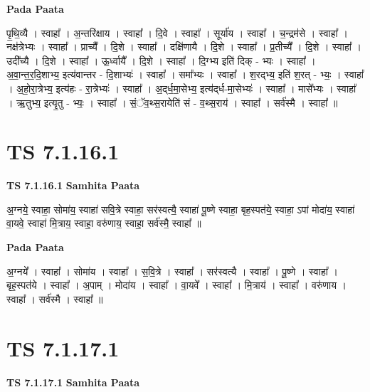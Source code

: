 \documentclass[17pt]{extarticle}
\begin{document}
\textbf{Pada Paata} \newline

पृ॒थि॒व्यै । स्वाहा᳚ । अ॒न्तरि॑क्षाय । स्वाहा᳚ । दि॒वे । स्वाहा᳚ । सूर्या॑य । स्वाहा᳚ । च॒न्द्रम॑से । स्वाहा᳚ । नक्ष॑त्रेभ्यः । स्वाहा᳚ । प्राच्यै᳚ । दि॒शे । स्वाहा᳚ । दक्षि॑णायै । दि॒शे । स्वाहा᳚ । प्र॒तीच्यै᳚ । दि॒शे । स्वाहा᳚ । उदी᳚च्यै । दि॒शे । स्वाहा᳚ । ऊ॒र्ध्वायै᳚ । दि॒शे । स्वाहा᳚ । दि॒ग्भ्य इति॑ दिक् - भ्यः । स्वाहा᳚ । अ॒वा॒न्त॒र॒दि॒शाभ्य॒ इत्य॑वान्तर - दि॒शाभ्यः॑ । स्वाहा᳚ । समा᳚भ्यः । स्वाहा᳚ । श॒रद्भ्य॒ इति॑ श॒रत् - भ्यः॒ । स्वाहा᳚ । अ॒हो॒रा॒त्रेभ्य॒ इत्य॑हः - रा॒त्रेभ्यः॑ । स्वाहा᳚ । अ॒द्‌र्ध॒मा॒सेभ्य॒ इत्य॑द्‌र्ध-मा॒सेभ्यः॑ । स्वाहा᳚ । मासे᳚भ्यः । स्वाहा᳚ । ऋ॒तुभ्य॒ इत्यृ॒तु - भ्यः॒ । स्वाहा᳚ । सं॒ॅव॒थ्स॒रायेति॑ सं - व॒थ्स॒राय॑ । स्वाहा᳚ । सर्व॑स्मै । स्वाहा᳚ ॥  \newline




\section*{ TS 7.1.16.1 }

\textbf{TS 7.1.16.1 } \newline
\textbf{Samhita Paata} \newline

अ॒ग्नये॒ स्वाहा॒ सोमा॑य॒ स्वाहा॑ सवि॒त्रे स्वाहा॒ सर॑स्वत्यै॒ स्वाहा॑ पू॒ष्णे स्वाहा॒ बृह॒स्पत॑ये॒ स्वाहा॒ ऽपां मोदा॑य॒ स्वाहा॑ वा॒यवे॒ स्वाहा॑ मि॒त्राय॒ स्वाहा॒ वरु॑णाय॒ स्वाहा॒ सर्व॑स्मै॒ स्वाहा᳚ ॥ \newline

\textbf{Pada Paata} \newline

अ॒ग्नये᳚ । स्वाहा᳚ । सोमा॑य । स्वाहा᳚ । स॒वि॒त्रे । स्वाहा᳚ । सर॑स्वत्यै । स्वाहा᳚ । पू॒ष्णे । स्वाहा᳚ । बृह॒स्पत॑ये । स्वाहा᳚ । अ॒पाम् । मोदा॑य । स्वाहा᳚ । वा॒यवे᳚ । स्वाहा᳚ । मि॒त्राय॑ । स्वाहा᳚ । वरु॑णाय । स्वाहा᳚ । सर्व॑स्मै । स्वाहा᳚ ॥  \newline




\section*{ TS 7.1.17.1 }

\textbf{TS 7.1.17.1 } \newline
\textbf{Samhita Paata} \newline
\end{document}
